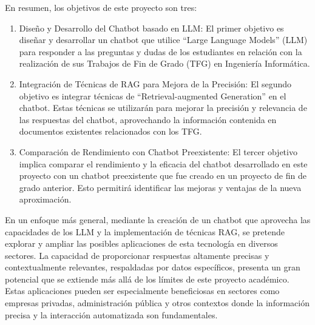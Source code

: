 En resumen, los objetivos de este proyecto son tres:
\begin{enumerate}
    \item Diseño y Desarrollo del Chatbot basado en LLM: El primer objetivo es diseñar y desarrollar un chatbot que utilice ``Large Language Models'' (LLM) para responder a las preguntas y dudas de los estudiantes en relación con la realización de sus Trabajos de Fin de Grado (TFG) en Ingeniería Informática.
    
    \item Integración de Técnicas de RAG para Mejora de la Precisión: El segundo objetivo es integrar técnicas de ``Retrieval-augmented Generation'' en el chatbot. Estas técnicas se utilizarán para mejorar la precisión y relevancia de las respuestas del chatbot, aprovechando la información contenida en documentos existentes relacionados con los TFG.

    \item Comparación de Rendimiento con Chatbot Preexistente: El tercer objetivo implica comparar el rendimiento y la eficacia del chatbot desarrollado en este proyecto con un chatbot preexistente que fue creado en un proyecto de fin de grado anterior. Esto permitirá identificar las mejoras y ventajas de la nueva aproximación.
    
\end{enumerate}

En un enfoque más general, mediante la creación de un chatbot que aprovecha las capacidades de los LLM y la implementación de técnicas RAG, se pretende explorar y ampliar las posibles aplicaciones de esta tecnología en diversos sectores. La capacidad de proporcionar respuestas altamente precisas y contextualmente relevantes, respaldadas por datos específicos, presenta un gran potencial que se extiende más allá de los límites de este proyecto académico. Estas aplicaciones pueden ser especialmente beneficiosas en sectores como empresas privadas, administración pública y otros contextos donde la información precisa y la interacción automatizada son fundamentales.





